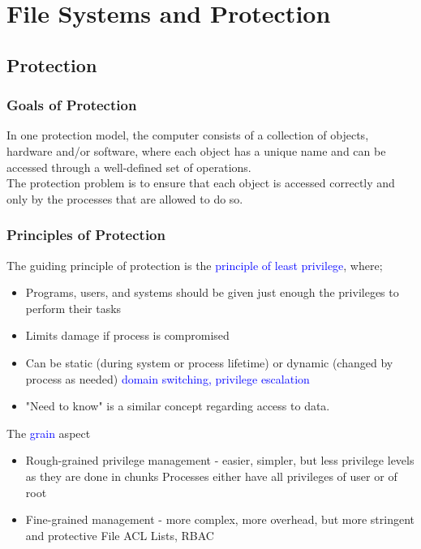 \documentclass[oneside]{book}
\begin{document}
    \chapter{File Systems and Protection}
        \section{Protection}
            \subsection{Goals of Protection}
                In one protection model, the computer consists of a collection of objects, hardware and/or software, where each object has a unique
                name and can be accessed through a well-defined set of operations.\\
                The protection problem is to ensure that each object is accessed correctly and only by the processes that are allowed to do so.
            \subsection{Principles of Protection}
                The guiding principle of protection is the \textcolor{blue}{principle of least privilege}, where;
                \begin{itemize}
                    \item Programs, users, and systems should be given just enough the privileges to perform their tasks
                    \item Limits damage if process is compromised
                    \item Can be static (during system or process lifetime) or dynamic (changed by process as needed) \textcolor{blue}{domain switching,
                    privilege escalation}
                    \item "Need to know" is a similar concept regarding access to data.
                \end{itemize}
                The \textcolor{blue}{grain} aspect
                \begin{itemize}
                    \item Rough-grained privilege management - easier, simpler, but less privilege levels as they are done in chunks
                        \subitem Processes either have all privileges of user or of root
                    \item Fine-grained management - more complex, more overhead, but more stringent and protective
                        \subitem File ACL Lists, RBAC
                \end{itemize}
\end{document}
